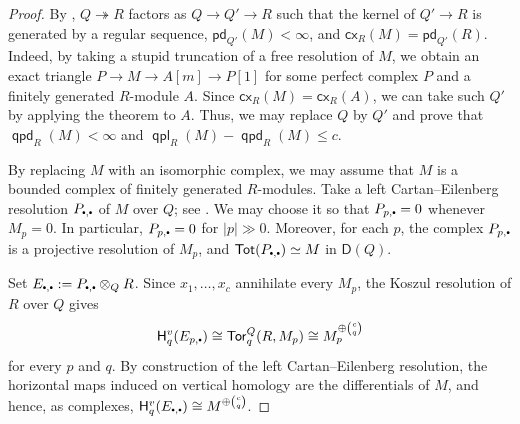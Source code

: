 \documentclass[10pt, a4paper,reqno]{amsart}
\theoremstyle{definition}
\theoremstyle{remark}
\numberwithin{equation}{thm}
\def\sH{\mathsf{H}}
\def\Tor{\operatorname{\mathsf{Tor}}}
\def\Tot{\operatorname{\mathsf{Tot}}}
\def\D{\mathsf{D}}
\def\cx{\mathsf{cx}}
\def\pd{\mathsf{pd}}
\def\qpd{\operatorname{\mathsf{qpd}}}
\def\qpl{\operatorname{\mathsf{qpl}}}
\newcommand{\mdot}{%
  \mathbin{\vcenter{\hbox{\scalebox{0.5}{$\bullet$}}}}%
}
\begin{document}
\begin{proof}
By \cite[Theorem 5.9]{AGP}, $Q \twoheadrightarrow R$ factors as $Q \to Q' \to R$ such that the kernel of $Q' \to R$ is generated by a regular sequence, $\pd_{Q'}(M) < \infty$, and $\cx_R(M) = \pd_{Q'}(R)$.
Indeed, by taking a stupid truncation of a free resolution of $M$, we obtain an exact triangle $P \to M \to A[m] \to P[1]$ for some perfect complex $P$ and a finitely generated $R$-module $A$.
Since $\cx_R(M) = \cx_R (A)$, we can take such $Q'$ by applying the theorem to $A$.
Thus, we may replace $Q$ by $Q'$ and prove that $\qpd_R(M)< \infty$ and $\qpl_R(M) - \qpd_R(M) \le c$.

By replacing $M$ with an isomorphic complex, we may assume that $M$ is a bounded complex of finitely generated $R$-modules.
Take a left Cartan--Eilenberg resolution $P_{\mdot,\mdot}$ of $M$ over $Q$; see \cite[Section~5.7]{Wei}.
We may choose it so that $P_{p,\mdot}=0$ whenever $M_p=0$.
In particular, $P_{p,\mdot}=0$ for $|p|\gg0$.
Moreover, for each $p$, the complex $P_{p,\mdot}$ is a projective resolution of $M_p$, and $\Tot(P_{\mdot,\mdot})\simeq M$ in $\D(Q)$.

Set $E_{\mdot,\mdot}:=P_{\mdot,\mdot}\otimes_QR$.
Since $x_1,\ldots,x_c$ annihilate every $M_p$, the Koszul resolution of $R$ over $Q$ gives
\[
\sH_q^v(E_{p,\mdot})
\cong
\Tor_q^Q(R,M_p)
\cong
M_p^{\oplus\binom{c}{q}}
\]
for every $p$ and $q$.
By construction of the left Cartan--Eilenberg resolution, the horizontal maps induced on vertical homology are the differentials of $M$, and hence, as complexes, $\sH_q^v(E_{\mdot,\mdot}) \cong M^{\oplus\binom{c}{q}}$.


\end{proof}
\end{document}
